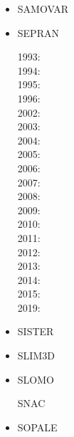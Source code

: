 \begin{itemize}
\item SAMOVAR
\cite{egat10}

\item SEPRAN

1993: \cite{beky93}\cite{vavy93}\\
1994: \cite{vlvv94}\cite{vayv94}\\
1995: \cite{vayv95}\\
1996: \cite{vayu96}\\
2002: \cite{civv02}\cite{vavv02}\\
2003: \cite{vavs03}\\
2004: \cite{vavv04}\cite{vavv04b}\cite{vavv04c}\\
2005: \cite{vavv05}\cite{sepr05}\\
2006: \cite{liva06a}\cite{liva06b}\\
2007: \cite{vant07}\cite{civv07}\cite{brva07a}\cite{brva07b}\\
2008: \cite{plva08}\\
2009: \cite{vavl09}\\
2010: \cite{vahy10}\cite{syva10}\\
2011: \cite{vahs11}\\
2012: \cite{besy12}\cite{beva12}\cite{chgv12}\\
2013: \cite{ancv13}\\
2014: \cite{chsg14}\cite{mova14}\\
2015: \cite{vasy15}\\
2019: \cite{zhdv19}\cite{vayu19}

\item SISTER

\cite{olbm16}

\item SLIM3D

\cite{poso08}
\cite{qusp10}
\cite{brps12}
\cite{brps13}
\cite{brau13}
\cite{brun14}
\cite{hebr14}
\cite{kobf14}
\cite{clbq15}
\cite{brcr17}
\cite{basq18}

\item SLOMO
\cite{kaus05}

\index SNAC
\cite{chlg08}


\item SOPALE


\end{itemize}
